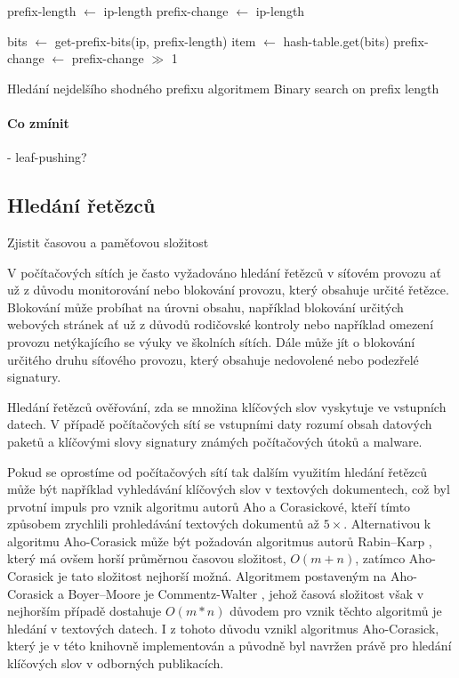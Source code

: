 \begin{algorithm}
	prefix-length $\leftarrow$ ip-length\;
	prefix-change $\leftarrow$ ip-length\;
	{
		bits $\leftarrow$ get-prefix-bits(ip, prefix-length)\;
		item $\leftarrow$ hash-table.get(bits)\;
		prefix-change $\leftarrow$ prefix-change $\gg$ 1\;

	}
	\caption{Hledání nejdelšího shodného prefixu algoritmem Binary search on prefix length}
\end{algorithm}

\paragraph{Co zmínit}
- leaf-pushing?

\subsection{Hledání řetězců} %

Zjistit časovou a paměťovou složitost

V počítačových sítích je často vyžadováno hledání řetězců v síťovém provozu ať už z důvodu monitorování
nebo blokování provozu, který obsahuje určité řetězce. Blokování může probíhat na úrovni obsahu, například
blokování určitých webových stránek ať už z důvodů rodičovské kontroly nebo například omezení provozu
netýkajícího se výuky ve školních sítích. Dále může jít o blokování určitého druhu síťového provozu,
který obsahuje nedovolené nebo podezřelé signatury.

Hledání řetězců ověřování, zda se množina klíčových slov vyskytuje ve vstupních datech.
V případě počítačových sítí se vstupními daty rozumí obsah datových paketů a klíčovými slovy
signatury známých počítačových útoků a malware.

Pokud se oprostíme od počítačových sítí tak dalším využitím hledání řetězců může být například
vyhledávání klíčových slov v textových dokumentech, což byl prvotní impuls pro vznik
algoritmu autorů Aho a Corasickové, kteří tímto způsobem zrychlili prohledávání
textových dokumentů až $5\times$. Alternativou k algoritmu Aho-Corasick může být požadován
algoritmus autorů Rabin–Karp \cite{rabin-karp}, který má ovšem horší průměrnou časovou složitost, $O(m+n)$,
zatímco Aho-Corasick je tato složitost nejhorší možná. Algoritmem postaveným na Aho-Corasick
a Boyer–Moore \cite{boyer-moore}
je Commentz-Walter \cite{walter}, jehož časová složitost však v nejhorším případě dostahuje $O(m*n)$
důvodem pro vznik těchto algoritmů je hledání v textových datech. I z tohoto důvodu vznikl
algoritmus Aho-Corasick, který je v této knihovně implementován a původně byl navržen
právě pro hledání klíčových slov v odborných publikacích.

